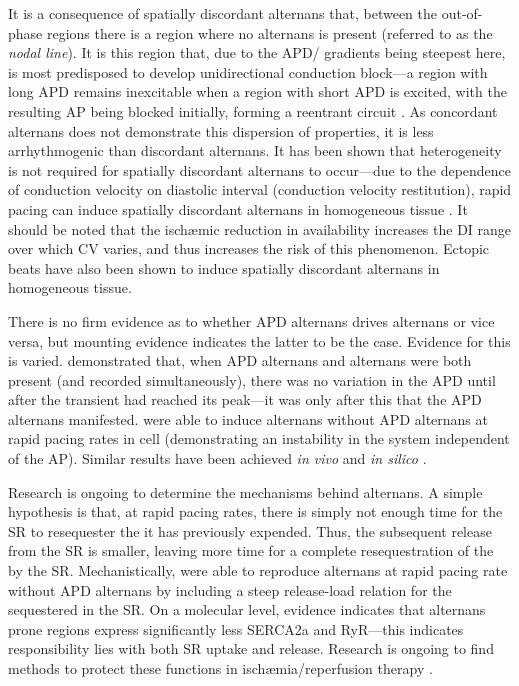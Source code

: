 \documentclass[../thesis-main.tex]{subfiles}
\begin{document}
 It is a consequence of spatially discordant alternans that, between the out-of-phase regions there is a region where no alternans is present (referred to as the \emph{nodal line}). It is this region that, due to the APD/\cai{} gradients being steepest here, is most predisposed to develop unidirectional conduction block---a region with long APD remains inexcitable when a region with short APD is excited, with the resulting AP being blocked initially, forming a reentrant circuit \citep{Laurita2008}. As concordant alternans does not demonstrate this dispersion of properties, it is less arrhythmogenic than discordant alternans. It has been shown that heterogeneity is not required for spatially discordant alternans to occur---due to the dependence of conduction velocity on diastolic interval (conduction velocity restitution), rapid pacing can induce spatially discordant alternans in homogeneous tissue \citep{Watanabe2001}. It should be noted that the isch\ae{}mic reduction in \ina{} availability increases the DI range over which CV varies, and thus increases the risk of this phenomenon. Ectopic beats have also been shown to induce spatially discordant alternans in homogeneous tissue.
 
 There is no firm evidence as to whether APD alternans drives \ca{} alternans or vice versa, but mounting evidence indicates the latter to be the case. Evidence for this is varied. \citet{Lee1988} demonstrated that, when APD alternans and \ca{} alternans were both present (and recorded simultaneously), there was no variation in the APD until after the \ca{} transient had reached its peak---it was only after this that the APD alternans manifested. \citet{Chudin1999} were able to induce \ca{} alternans without APD alternans at rapid pacing rates in cell (demonstrating an instability in the \ca{} system independent of the AP). Similar results have been achieved \emph{in vivo} \citep{Aistrup2006} and \emph{in silico} \citep{Sato2006}.
 
 Research is ongoing to determine the mechanisms behind \ca{} alternans. A simple hypothesis is that, at rapid pacing rates, there is simply not enough time for the SR to resequester the \ca{} it has previously expended. Thus, the subsequent \ca{} release from the SR is smaller, leaving more time for a complete resequestration of the \ca{} by the SR. Mechanistically, \citet{Shiferaw2003} were able to reproduce \ca{} alternans at rapid pacing rate without APD alternans by including a steep release-load relation for the \ca{} sequestered in the SR. On a molecular level, evidence indicates that alternans prone regions express significantly less SERCA2a and RyR---this indicates responsibility lies with both SR uptake and release. Research is ongoing to find methods to protect these functions in isch\ae{}mia/reperfusion therapy \citep{Wang2013}.
 
\end{document}
